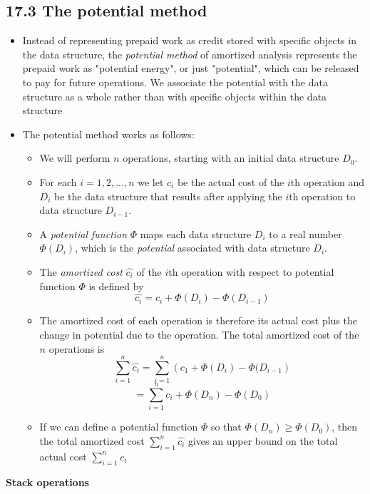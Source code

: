 \documentclass{report}
\begin{document}
\subsection*{17.3 The potential method}
\begin{itemize}
    \item Instead of representing prepaid work as credit stored with specific objects in the data structure, the \textit{potential method} of amortized analysis represents the prepaid work as "potential energy", or just "potential", which can be released to pay for future operations. We associate the potential with the data structure as a whole rather than with specific objects within the data structure
    \item The potential method works as follows:
    \begin{itemize}
        \item We will perform $n$ operations, starting with an initial data structure $D_0$. 
        \item For each $i = 1, 2, ..., n$ we let $c_i$ be the actual cost of the $i$th operation and $D_i$ be the data structure that results after applying the $i$th operation to data structure $D_{i - 1}$. 
        \item A \textit{potential function} $\Phi$ maps each data structure $D_i$ to a real number $\Phi(D_i)$, which is the \textit{potential} associated with data structure $D_i$.
        \item The \textit{amortized cost} $\hat{c_i}$ of the $i$th operation with respect to potential function $\Phi$ is defined by
        $$\hat{c_i} = c_i + \Phi(D_i) - \Phi(D_{i - 1})$$
        \item The amortized cost of each operation is therefore its actual cost plus the change in potential due to the operation. The total amortized cost of the $n$ operations is 
        $$\sum^n _{i = 1} \hat{c_i} = \sum^n _{i = 1} \left( c_1 + \Phi(D_i) - \Phi(D_{i - 1} \right)$$
        $$ = \sum^n _{i = 1} c_i + \Phi(D_n) - \Phi(D_0)$$
        \item If we can define a potential function $\Phi$ so that $\Phi(D_n) \geq \Phi(D_0)$, then the total amortized cost $\sum^n _{i = 1} \hat{c_i}$ gives an upper bound on the total actual cost $\sum^n _{i = 1} c_i$
    \end{itemize}
\end{itemize}
\textbf{Stack operations}
\end{document}
